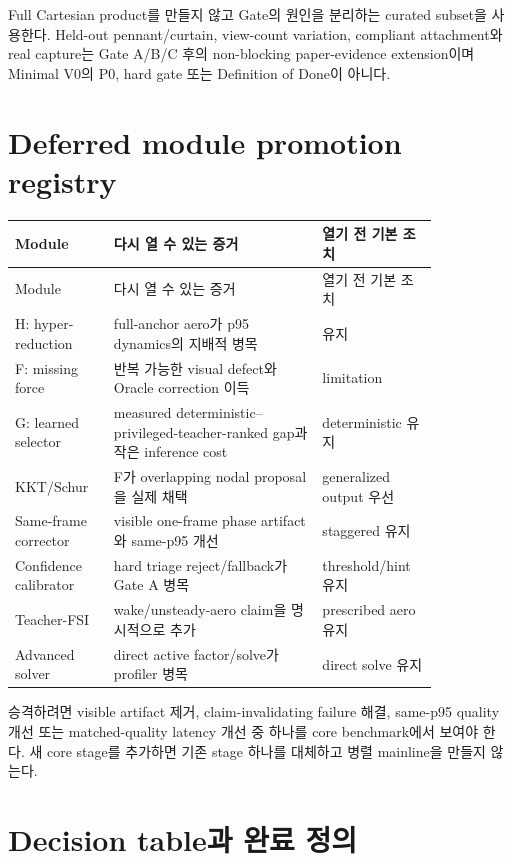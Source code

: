 \documentclass[10pt]{article}
\begin{document}
Full Cartesian product를 만들지 않고 Gate의 원인을 분리하는 curated subset을 사용한다.
Held-out pennant/curtain, view-count variation, compliant attachment와 real capture는
Gate A/B/C 후의 non-blocking paper-evidence extension이며 Minimal V0의 P0, hard gate 또는
Definition of Done이 아니다.

\section{Deferred module promotion registry}

{\small
\setlength{\tabcolsep}{4pt}
\begin{longtable}{L{0.19\linewidth}L{0.43\linewidth}L{0.22\linewidth}}
\toprule
Module & 다시 열 수 있는 증거 & 열기 전 기본 조치\\
\midrule
\endfirsthead
\toprule
Module & 다시 열 수 있는 증거 & 열기 전 기본 조치\\
\midrule
\endhead
H: hyper-reduction & full-anchor aero가 p95 dynamics의 지배적 병목 & 유지\\[0.15em]
F: missing force & 반복 가능한 visual defect와 Oracle correction 이득 & limitation\\[0.15em]
G: learned selector & measured deterministic--privileged-teacher-ranked gap과 작은 inference cost & deterministic 유지\\[0.15em]
KKT/Schur & F가 overlapping nodal proposal을 실제 채택 & generalized output 우선\\[0.15em]
Same-frame corrector & visible one-frame phase artifact와 same-p95 개선 & staggered 유지\\[0.15em]
Confidence calibrator & hard triage reject/fallback가 Gate A 병목 & threshold/hint 유지\\[0.15em]
Teacher-FSI & wake/unsteady-aero claim을 명시적으로 추가 & prescribed aero 유지\\[0.15em]
Advanced solver & direct active factor/solve가 profiler 병목 & direct solve 유지\\
\bottomrule
\end{longtable}
}

승격하려면 visible artifact 제거, claim-invalidating failure 해결,
same-p95 quality 개선 또는 matched-quality latency 개선 중 하나를 core benchmark에서 보여야 한다.
새 core stage를 추가하면 기존 stage 하나를 대체하고 병렬 mainline을 만들지 않는다.

\section{Decision table과 완료 정의}
\end{document}
